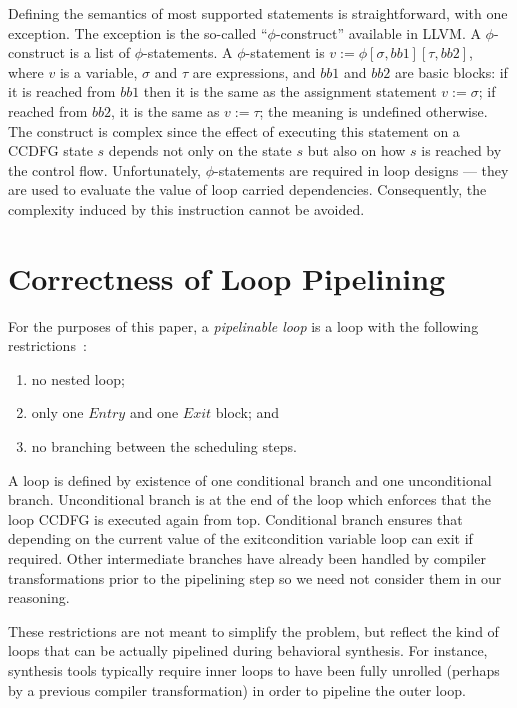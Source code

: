 Defining the semantics of most supported statements is
straightforward, with one exception.  The exception is the
so-called ``$\phi$-construct'' available in LLVM.  A
$\phi$-construct is a list of $\phi$-statements.  A
$\phi$-statement is $v := \phi [\sigma, bb1] [\tau, bb2]$,
where $v$ is a variable, $\sigma$ and $\tau$ are
expressions, and $bb1$ and $bb2$ are basic blocks: if it is
reached from $bb1$ then it is the same as the assignment
statement $v := \sigma$; if reached from $bb2$, it is the
same as $v := \tau$; the meaning is undefined otherwise. The
construct is complex since the effect of executing this
statement on a CCDFG state $s$ depends not only on the state
$s$ but also on how $s$ is reached by the control flow.
Unfortunately, $\phi$-statements are required in loop designs ---
they are used to evaluate the value of loop carried dependencies.
Consequently, the complexity induced
by this instruction cannot be avoided.

\section{Correctness of Loop Pipelining}

For the purposes of this paper, a {\em pipelinable loop} is
a loop with the following restrictions~\cite{hrx:dac-12}:
\begin{enumerate}
\item no nested loop;
\item only one $Entry$ and one $Exit$ block; and
\item no branching between the scheduling steps.
\end{enumerate}

A loop is defined by existence of one conditional branch and one unconditional branch. Unconditional branch is at the end of the loop which enforces that the loop CCDFG is executed again from top. Conditional branch ensures that depending on the current value of the exitcondition variable loop can exit if required. Other intermediate branches have already been handled by compiler transformations prior to the pipelining step so we need not consider them in our reasoning. 

These restrictions are not meant to simplify the problem, but reflect
the kind of loops that can be actually pipelined during behavioral
synthesis.  For instance, synthesis tools typically require inner
loops to have been fully unrolled (perhaps by a previous compiler
transformation) in order to pipeline the outer loop.

